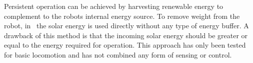 Persistent operation can be achieved by harvesting renewable energy to complement to the robots internal energy source. 
To remove weight from the robot, in~\cite{bruhwiler_iros_2015} the solar energy is used directly without any type of energy buffer. 
A drawback of this method is that the incoming solar energy should be greater or equal to the energy required for operation. 
This approach has only been tested for basic locomotion and has not combined any form of sensing or control.




